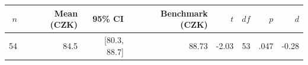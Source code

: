 \begin{tabular}{rrrrrrrr}
\toprule
$n$ & Mean (CZK) & 95\% CI & Benchmark (CZK) & $t$ & $df$ & $p$ & $d$ \\
\midrule
54 & 84.5 & [80.3, 88.7] & 88.73 & -2.03 & 53 & .047 & -0.28 \\
\bottomrule
\end{tabular}
